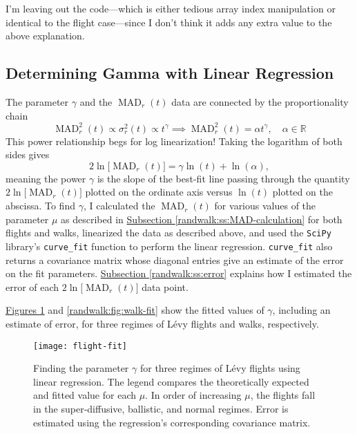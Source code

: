 \documentclass[11pt, a4paper]{article}
\newcommand{\lev}{L\'evy\xspace}
\newcommand{\mad}{\operatorname{MAD}}
\begin{document}
I'm leaving out the code---which is either tedious array index manipulation or identical to the flight case---since I don't think it adds any extra value to the above explanation.


\subsection{Determining Gamma with Linear Regression}
The parameter $ \gamma $ and the $ \mad_{r}(t) $ data are connected by the proportionality chain
\begin{equation*}
	\mad_{r}^{2}(t) \propto \sigma_{r}^{2}(t) \propto t^{\gamma} \implies \mad_{r}^{2}(t) = \alpha t^{\gamma}, \quad \alpha \in \mathbb{R}
\end{equation*}
This power relationship begs for log linearization! Taking the logarithm of both sides gives
\begin{equation*}
	2 \ln\big[\mad_{r}(t)\big] = \gamma \ln(t) + \ln(\alpha),
\end{equation*}
meaning the power $ \gamma $ is the slope of the best-fit line passing through the quantity $ 2 \ln\big[\mad_{r}(t)\big] $ plotted on the ordinate axis versus $ \ln(t) $ plotted on the abscissa. To find $ \gamma $, I calculated the $ \mad_{r}(t) $ for various values of the parameter $ \mu $ as described in \hyperref[randwalk:ss:MAD-calculation]{Subsection \ref{randwalk:ss:MAD-calculation}} for both flights and walks, linearized the data as described above, and used the \texttt{SciPy} library's \texttt{curve\_fit} function to perform the linear regression. \texttt{curve\_fit} also returns a covariance matrix whose diagonal entries give an estimate of the error on the fit parameters.  \hyperref[randwalk:ss:error]{Subsection \ref{randwalk:ss:error}} explains how I estimated the error of each $ 2 \ln\big[\mad_{r}(t)\big] $ data point.

\vspace{2mm}
\hyperref[randwalk:fig:flight-fit]{Figures \ref{randwalk:fig:flight-fit}} and \ref{randwalk:fig:walk-fit} show the fitted values of $ \gamma $, including an estimate of error, for three regimes of \lev flights and walks, respectively.

\begin{figure}
	\centering
	\texttt{[image: flight-fit]}
	\caption{Finding the parameter $ \gamma $ for three regimes of \lev flights using linear regression. The legend compares the theoretically expected and fitted value for each $ \mu $. In order of increasing $ \mu $, the flights fall in the super-diffusive, ballistic, and normal regimes. Error is estimated using the regression's corresponding covariance matrix.}
	\label{randwalk:fig:flight-fit}
\end{figure}
\end{document}
